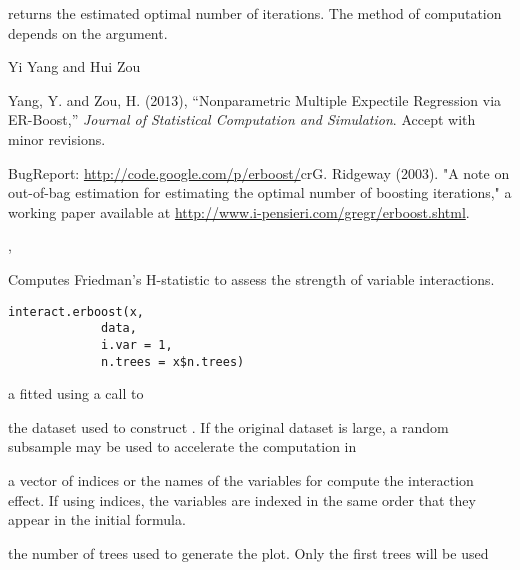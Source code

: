 \documentclass[a4paper]{book}
\begin{document}
%
\begin{Value}
 returns the estimated optimal number of iterations. The method 
of computation depends on the  argument.
\end{Value}
%
\begin{Author}\relax
Yi Yang  and Hui Zou 
\end{Author}
%
\begin{References}\relax
Yang, Y. and Zou, H. (2013), ``Nonparametric Multiple Expectile Regression via ER-Boost,'' \emph{Journal of Statistical Computation and Simulation}. Accept with minor revisions.

BugReport: \url{http://code.google.com/p/erboost/}\bsl{}crG. Ridgeway (2003). "A note on out-of-bag estimation for estimating the optimal
number of boosting iterations," a working paper available at
\url{http://www.i-pensieri.com/gregr/erboost.shtml}.
\end{References}
%
\begin{SeeAlso}\relax
{}, 
\end{SeeAlso}
%
\begin{Description}\relax
 Computes Friedman's H-statistic to assess the strength of variable interactions. 
\end{Description}
%
\begin{Usage}
\begin{verbatim}
interact.erboost(x,
             data,
             i.var = 1,
             n.trees = x$n.trees)
\end{verbatim}
\end{Usage}
%
\begin{Arguments}
\begin{ldescription}
\item[\code{x}]  a  fitted using a call to 
\item[\code{data}]  the dataset used to construct . If the original dataset is
large, a random subsample may be used to accelerate the computation in
\item[\code{i.var}] a vector of indices or the names of the variables for compute
the interaction effect. If using indices, the variables are indexed in the
same order that they appear in the initial  formula.
\item[\code{n.trees}]  the number of trees used to generate the plot. Only the first
 trees will be used
\end{ldescription}
\end{Arguments}
\end{document}
